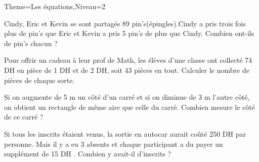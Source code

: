 \documentclass[a4paper,12pt]{article}
\begin{document}
\begin{Maquette}[Fiche]{Theme=Les équations,Niveau=2}
\begin{exercice}
Cindy, Eric et Kevin se sont partagés 89 pin's(épingles).Cindy a pris trois fois plus de pin's que Eric et Kevin a pris 5 pin's de plus que Cindy. Combien ont-ils de pin's chacun ?
\end{exercice}

\begin{exercice}
Pour offrir un cadeau à leur prof de Math, les élèves d'une classe ont collecté 74 DH en pièce de 1 DH et de 2 DH, soit 43 pièces en tout. Calculer le nombre de pièces de  chaque sorte.
\end{exercice}

\begin{exercice}
Si on augmente de 5 m un côté d'un carré et si on diminue de 3 m l'autre côté, on obtient un rectangle de même aire que celle du carré. Combien mesure le côté de ce carré ?
\end{exercice}

\begin{exercice}
Si tous les inscrits étaient venus, la sortie en autocar aurait coûté 250 DH par personne. Mais il y a eu 3 absents et chaque participant a du payer un supplément de 15 DH . Combien y avait-il d'inscrits ?
\end{exercice}



\end{Maquette}
\end{document}

